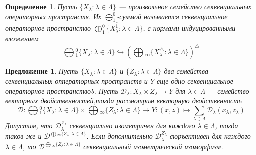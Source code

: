 \documentclass[12pt]{article}
\newtheorem{proposition}[theorem]{Предложение}
\newtheorem{definition}[theorem]{Определение}
\begin{document}
\begin{definition}\label{DefSQCoProd}
Пусть $\{X_\lambda: \lambda \in \Lambda\}$ --- произвольное семейство секвенциальных операторных пространств. Их $\bigoplus_1^0$-суммой называется секвенциальное операторное пространство  
$\bigoplus_1^0\{X_\lambda^{\wideparen{1}}:\lambda\in \Lambda\}$, с нормами индуцированными вложением
$$
\bigoplus{}_1^0\{X_\lambda:\lambda \in \Lambda\}\hookrightarrow
\left(\bigoplus{}_\infty\{X_\lambda^\triangle:\lambda\in \Lambda\}\right)^\triangle
$$
\end{definition}

\begin{proposition}\label{PrVectDualCoProdComp} Пусть $\{X_\lambda:\lambda\in\Lambda\}$ и $\{Z_\lambda:\lambda\in\Lambda\}$ два семейства секвенциальных опператорных пространств и $Y$ еще одно секвенциальное операторное пространствоb. Пусть $\mathcal{D}_\lambda: X_\lambda\times Z_\lambda\to Y$ для $\lambda\in\Lambda$ --- семейство векторных двойственностей,тогда рассмотрим векторную двойственность
$$
\mathcal{D}:\bigoplus{}_1^0\{X_\lambda:\lambda\in\Lambda\}\times\bigoplus{}_\infty\{Z_\lambda:\lambda\in\Lambda\}\to Y:(x,z)\mapsto\sum\limits_{\lambda\in\Lambda}\mathcal{D}_\lambda(x_\lambda,z_\lambda)
$$
Допустим, что $\mathcal{D}_\lambda^{Z_\lambda}$ секвенциально изометричен для каждого $\lambda\in\Lambda$, тогда таков же и $\mathcal{D}^{\bigoplus{}_\infty\{Z_\lambda:\lambda\in\Lambda\}}$. Если дополнительно $\mathcal{D}_\lambda^{Z_\lambda}$ сюръективен для каждого $\lambda\in\Lambda$, то $\mathcal{D}^{\bigoplus{}_\infty\{Z_\lambda:\lambda\in\Lambda\}}$ секвенциальный изометрический изоморфизм.
\end{proposition}
\end{document}
